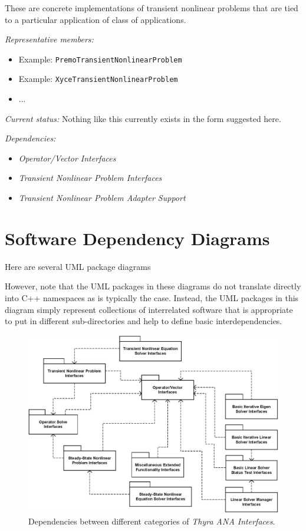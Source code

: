 \documentclass[pdf,ps2pdf,11pt]{SANDreport}
\begin{document}
These are concrete implementations of transient nonlinear problems that are
tied to a particular application of class of applications.

{}\textit{Representative members:}
\begin{itemize}
%
{}\item Example: {}\texttt{PremoTransientNonlinearProblem}
%
{}\item Example: {}\texttt{XyceTransientNonlinearProblem}
%
{}\item ...
%
\end{itemize}

{}\textit{Current status:} Nothing like this currently exists in the form
suggested here.

{}\textit{Dependencies:}
\begin{itemize}
\item {}\textit{Operator/Vector Interfaces}
\item {}\textit{Transient Nonlinear Problem Interfaces}
\item {}\textit{Transient Nonlinear Problem Adapter Support}
\end{itemize}

%
\section{Software Dependency Diagrams}
%

Here are several UML package diagrams 

However, note that the UML packages in these diagrams do not translate
directly into C++ namespaces as is typically the case.  Instead, the UML
packages in this diagram simply represent collections of interrelated software
that is appropriate to put in different sub-directories and help to define
basic interdependencies.

{\bsinglespace
\begin{figure}[p]
\begin{center}
\includegraphics*[scale=0.70]{ThyraANAInterfaces}
\end{center}
\caption{
\label{thyra:fig:ThyraANAInterfaces}
Dependencies between different categories of {}\textit{Thyra ANA Interfaces}.
}
\end{figure}
\esinglespace}
\end{document}
